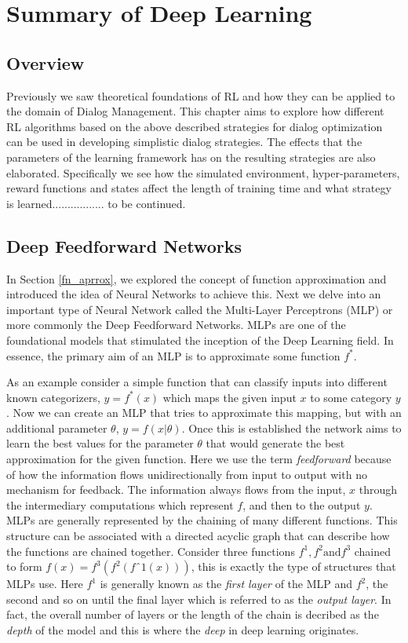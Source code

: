 \documentclass[14pt]{extarticle}
\numberwithin{equation}{section}
\begin{document}
	\section[Deep Learning]{Summary of Deep Learning}
	\subsection{Overview}
	Previously we saw theoretical foundations of RL and how they can be applied to the domain of Dialog Management. This chapter aims to explore how different RL algorithms based on the above described strategies for dialog optimization can be used in developing simplistic dialog strategies. The effects that the parameters of the learning framework has on the resulting strategies are also elaborated. Specifically we see how the simulated environment, hyper-parameters, reward functions and states affect the length of training time and what strategy is learned................. to be continued.
	
	\subsection{Deep Feedforward Networks}
	In Section \ref{fn_aprrox}, we explored the concept of function approximation and introduced the idea of Neural Networks to achieve this. Next we delve into an important type of Neural Network called the Multi-Layer Perceptrons (MLP) or more commonly the Deep Feedforward Networks. MLPs are one of the foundational models that stimulated the inception of the Deep Learning field. In essence, the primary aim of an MLP is to approximate some function $f^*$\cite{Goodfellow-et-al-2016}. 
	
	As an example consider a simple function that can classify inputs into different known categorizers, $y = f^*(x)$ which maps the given input $x$ to some category $y$. Now we can create an MLP that tries to approximate this mapping, but with an additional parameter $\theta$, $y = f(x|\theta)$. Once this is established the network aims to learn the best values for the parameter $\theta$ that would generate the best approximation for the given function.
	Here we use the term \textit{feedforward}  because of how the information flows unidirectionally from input to output with no mechanism for feedback. The information always flows from the input, $x$ through the intermediary computations which represent $f$, and then to the output $y$. 
	MLPs are generally represented by the chaining of many different functions. This structure can be associated with a directed acyclic graph that can describe how the functions are chained together. Consider three functions $f^1, f^2 \text{and} f^3$ chained to form $f(x) = f^3(f^2(fˆ1(x) ))$, this is exactly the type of structures that MLPs use. Here $f^1$ is generally known as the \textit{first layer} of the MLP and $f^2$, the second and so on until the final layer which is referred to as the \textit{output layer}. In fact, the overall number of layers or the length of the chain is decribed as the \textit{depth} of the model and this is where the \textit{deep} in deep learning originates.
	
\end{document}
